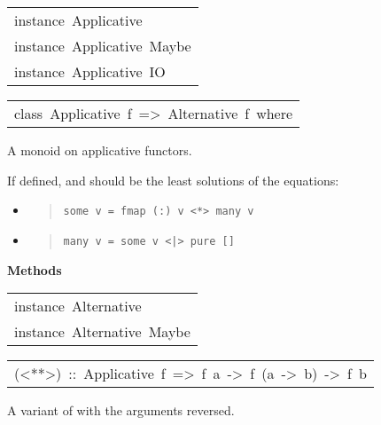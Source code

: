 \begin{haddockdesc}
\item[\begin{tabular}{@{}l}
instance\ Applicative\ {\char 91}{\char 93}\\instance\ Applicative\ Maybe\\instance\ Applicative\ IO
\end{tabular}]
\end{haddockdesc}
\begin{haddockdesc}
\item[\begin{tabular}{@{}l}
class\ Applicative\ f\ =>\ Alternative\ f\ where
\end{tabular}]\haddockbegindoc
A monoid on applicative functors.\par
If defined,  and  should be the least solutions
 of the equations:\par
\begin{itemize}
\item
\begin{quote}
{\haddockverb\begin{verbatim}
some v = fmap (:) v <*> many v\end{verbatim}}
\end{quote}

\item
\begin{quote}
{\haddockverb\begin{verbatim}
many v = some v <|> pure []\end{verbatim}}
\end{quote}

\end{itemize}

\haddockpremethods{}\textbf{Methods}
\end{haddockdesc}
\begin{haddockdesc}
\item[\begin{tabular}{@{}l}
instance\ Alternative\ {\char 91}{\char 93}\\instance\ Alternative\ Maybe
\end{tabular}]
\end{haddockdesc}
\begin{haddockdesc}
\item[\begin{tabular}{@{}l}
(<**>)\ ::\ Applicative\ f\ =>\ f\ a\ ->\ f\ (a\ ->\ b)\ ->\ f\ b
\end{tabular}]\haddockbegindoc
A variant of \haddockid{<*>} with the arguments reversed.\par

\end{haddockdesc}
